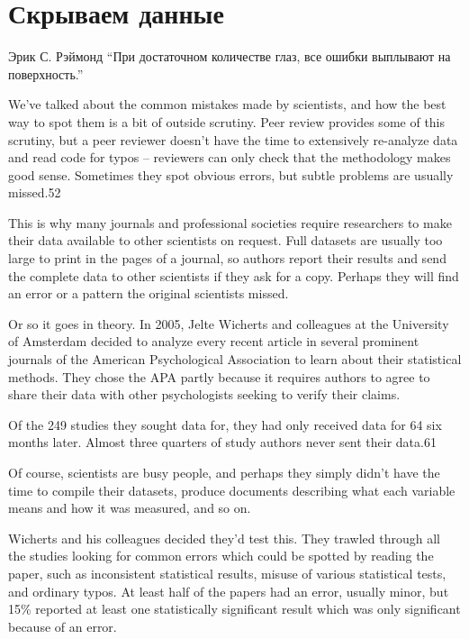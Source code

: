 \chapter{Скрываем данные}
\label{chp10}

\begin{chapquote}{Эрик С. Рэймонд}
``При достаточном количестве глаз, все ошибки выплывают на поверхность.''
\end{chapquote}


We’ve talked about the common mistakes made by scientists, and how the best way to spot them is a bit of outside scrutiny. Peer review provides some of this scrutiny, but a peer reviewer doesn’t have the time to extensively re-analyze data and read code for typos – reviewers can only check that the methodology makes good sense. Sometimes they spot obvious errors, but subtle problems are usually missed.52

This is why many journals and professional societies require researchers to make their data available to other scientists on request. Full datasets are usually too large to print in the pages of a journal, so authors report their results and send the complete data to other scientists if they ask for a copy. Perhaps they will find an error or a pattern the original scientists missed.

Or so it goes in theory. In 2005, Jelte Wicherts and colleagues at the University of Amsterdam decided to analyze every recent article in several prominent journals of the American Psychological Association to learn about their statistical methods. They chose the APA partly because it requires authors to agree to share their data with other psychologists seeking to verify their claims.

Of the 249 studies they sought data for, they had only received data for 64 six months later. Almost three quarters of study authors never sent their data.61

Of course, scientists are busy people, and perhaps they simply didn’t have the time to compile their datasets, produce documents describing what each variable means and how it was measured, and so on.

Wicherts and his colleagues decided they’d test this. They trawled through all the studies looking for common errors which could be spotted by reading the paper, such as inconsistent statistical results, misuse of various statistical tests, and ordinary typos. At least half of the papers had an error, usually minor, but 15\% reported at least one statistically significant result which was only significant because of an error.

